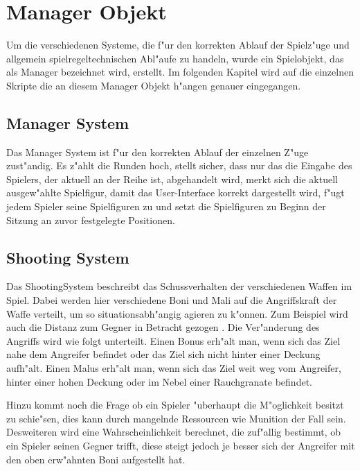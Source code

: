 \chapter{Manager Objekt}

Um die verschiedenen Systeme, die f"ur den korrekten Ablauf der Spielz"uge und allgemein spielregeltechnischen Abl"aufe zu handeln, wurde ein Spielobjekt, das als Manager bezeichnet wird, erstellt. Im folgenden Kapitel wird auf die einzelnen Skripte die an diesem Manager Objekt h"angen genauer eingegangen. 

\section{Manager System}

Das Manager System ist f"ur den korrekten Ablauf der einzelnen Z"uge zust"andig. Es z"ahlt die Runden hoch, stellt sicher, dass nur das die Eingabe des Spielers, der aktuell an der Reihe ist, abgehandelt wird, merkt sich die aktuell ausgew"ahlte Spielfigur, damit das User-Interface korrekt dargestellt wird, f"ugt jedem Spieler seine Spielfiguren zu und setzt die Spielfiguren zu Beginn der Sitzung an zuvor festgelegte Positionen.

\section{Shooting System}

Das ShootingSystem beschreibt das Schussverhalten der verschiedenen Waffen im Spiel. Dabei werden hier verschiedene Boni und Mali auf die Angriffskraft der Waffe verteilt, um so situationsabh"angig agieren zu k"onnen. Zum Beispiel wird auch die Distanz zum Gegner in Betracht gezogen . Die Ver"anderung des Angriffs wird wie folgt unterteilt. \newline
Einen Bonus erh"alt man, wenn sich das Ziel nahe dem Angreifer befindet oder das Ziel sich nicht hinter einer Deckung aufh"alt. \newline
Einen Malus erh"alt man, wenn sich das Ziel weit weg vom Angreifer, hinter einer hohen Deckung oder im Nebel einer Rauchgranate befindet.\newline

Hinzu kommt noch die Frage ob ein Spieler "uberhaupt die M"oglichkeit besitzt zu schie"sen, dies kann durch mangelnde Ressourcen wie Munition der Fall sein.
Desweiteren wird eine Wahrscheinlichkeit berechnet, die zuf"allig bestimmt, ob ein Spieler seinen Gegner trifft, diese steigt jedoch je besser sich der Angreifer mit den oben erw"ahnten Boni aufgestellt hat.


